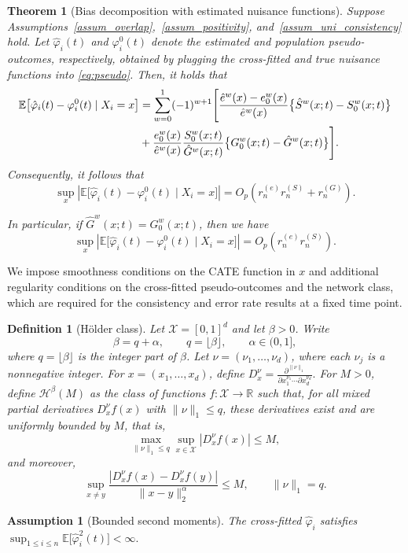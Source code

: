 \documentclass{article}
\newtheorem{theorem}{Theorem}
\newtheorem{assumption}{Assumption}
\newtheorem{definition}{Definition}
\begin{document}
\begin{theorem}[Bias decomposition with estimated nuisance functions]\label{thm:bias_full}
     Suppose Assumptions~\ref{assum_overlap},~\ref{assum_positivity}, and~\ref{assum_uni_consistency} hold. Let $\hat{\varphi}_i(t)$ and $\varphi_i^0(t)$ denote the estimated and population pseudo-outcomes, respectively, obtained by plugging the cross-fitted and true nuisance functions into \eqref{eq:pseudo}.
        Then,  it holds that
    \begin{align}
        \mathbb E\big[\hat\varphi_i(t)-\varphi_i^0(t)\mid X_i=x\big]
        &=
        \sum_{w=0}^1 (-1)^{w+1}
        \Bigg[
        \frac{\hat e^w(x)-e_0^w(x)}{\hat e^w(x)}
        \big\{\hat S^w(x;t)-S_0^w(x;t)\big\}
        \notag\\
        &
        +
        \frac{e_0^w(x)}{\hat e^w(x)}
        \frac{S_0^w(x;t)}{\hat G^w(x;t)}
        \big\{G_0^w(x;t)-\hat G^w(x;t)\big\}
        \Bigg].
        \label{eq:full_bias_decomp}
    \end{align}
    Consequently, it follows that
    \[
    \sup_x
    \left|
    \mathbb E\big[\hat\varphi_i(t)-\varphi_i^0(t)\mid X_i=x\big]
    \right|
    =
    O_p\!\left(r_n^{(e)}r_n^{(S)} + r_n^{(G)}\right).
    \]
    
    In particular, if \(\hat G^w(x;t)=G_0^w(x;t)\), then we have 
    \[
    \sup_x
    \left|
    \mathbb E\big[\hat\varphi_i(t)-\varphi_i^0(t)\mid X_i=x\big]
    \right|
    =
    O_p\!\left(r_n^{(e)}r_n^{(S)}\right).
    \]
    
\end{theorem}


 We impose smoothness conditions on the CATE function in \(x\) and additional regularity conditions on the cross-fitted pseudo-outcomes and the network class, which are required for the consistency and error rate results at a fixed time point.
 \begin{definition}[H\"older class]\label{def:holder}
Let \(\mathcal X=[0,1]^d\) and let \(\beta>0\). Write
\[
\beta=q+\alpha,
\qquad
q=\lfloor \beta\rfloor,
\qquad
\alpha\in(0,1],
\]
where $q=\lfloor \beta\rfloor$ is the integer part of $\beta$. Let \(\nu=(\nu_1,\ldots,\nu_d)\),  where each \(\nu_j\) is a nonnegative integer. 
For \(x=(x_1,\ldots,x_d)\), define
\(
D_x^\nu
=
\frac{\partial^{\|\nu\|_1}}{\partial x_1^{\nu_1}\cdots \partial x_d^{\nu_d}}.
\)
For \(M>0\), define \(\mathcal H^\beta(M)\) as the class of functions
\(
f:\mathcal X\to\mathbb R
\)
such that, for all mixed partial derivatives \(D_x^\nu f(x)\) with \(\|\nu\|_1\le q\), these derivatives exist and are uniformly bounded by \(M\), that is,
\[
\max_{\|\nu\|_1\le q}\sup_{x\in\mathcal X}|D_x^\nu f(x)|\le M,
\]
and moreover,
\[
\sup_{x\neq y}
\frac{|D_x^\nu f(x)-D_x^\nu f(y)|}{\|x-y\|_2^\alpha}
\le M,
\qquad \|\nu\|_1=q.
\]
\end{definition}
\begin{assumption}[Bounded second moments]\label{assum_moment} The cross-fitted 
$\hat\varphi_i$ satisfies
 \(
        \sup_{ 1\le i \le n} \mathbb E\big[\hat\varphi_i^2(t)\big] < \infty.
        \)
\end{assumption}
\end{document}
